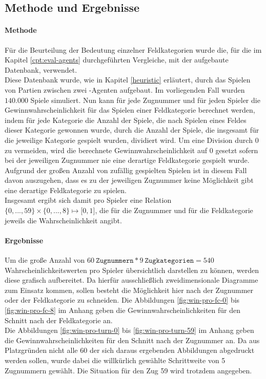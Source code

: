 \subsection{Methode und Ergebnisse}
\paragraph{Methode}
Für die Beurteilung der Bedeutung einzelner Feldkategorien wurde die, für die im Kapitel \ref{cpt:eval-agents} durchgeführten Vergleiche, mit der  aufgebaute Datenbank, verwendet.
\\Diese Datenbank wurde, wie in Kapitel \ref{heuristic} erläutert, durch das Spielen von Partien zwischen zwei -Agenten aufgebaut. Im vorliegenden Fall wurden $140.000$ Spiele simuliert. Nun kann für jede Zugnummer und für jeden Spieler die Gewinnwahrscheinlichkeit für das Spielen einer Feldkategorie berechnet werden, indem für jede Kategorie die Anzahl der Spiele, die nach Spielen eines Feldes dieser Kategorie gewonnen wurde, durch die Anzahl der Spiele, die insgesamt für die jeweilige Kategorie gespielt wurden, dividiert wird. Um eine Division durch $0$ zu vermeiden, wird die berechnete Gewinnwahrscheinlichkeit auf $0$ gesetzt sofern bei der jeweiligen Zugnummer nie eine derartige Feldkategorie gespielt wurde. Aufgrund der großen Anzahl von zufällig gespielten Spielen ist in diesem Fall davon auszugehen, dass es zu der jeweiligen Zugnummer keine Möglichkeit gibt eine derartige Feldkategorie zu spielen. 
\\Insgesamt ergibt sich damit pro Spieler eine Relation $\lbrace0, ..., 59\rbrace\times\lbrace0, ..., 8\rbrace\mapsto\lbrack0,1\rbrack$, die für die Zugnummer und für die Feldkategorie jeweils die Wahrscheinlichkeit angibt.
  
\paragraph{Ergebnisse}
Um die große Anzahl von $60\ \mathtt{Zugnummern} * 9\ \mathtt{Zugkategorien} = 540$ Wahrscheinlichkeitswerten pro Spieler übersichtlich darstellen zu können, werden diese grafisch aufbereitet. Da hierfür ausschließlich zweidimensionale Diagramme zum Einsatz kommen, sollen besteht die Möglichkeit hier nach der Zugnummer oder der Feldkategorie zu schneiden. Die Abbildungen \ref{fig:win-pro-fc-0} bis \ref{fig:win-pro-fc-8} im Anhang geben die Gewinnwahrscheinlichkeiten für den Schnitt nach der Feldkategorie an.
\\Die Abbildungen \ref{fig:win-pro-turn-0} bis \ref{fig:win-pro-turn-59} im Anhang geben die Gewinnwahrscheinlichkeiten für den Schnitt nach der Zugnummer an. Da aus Platzgründen nicht alle 60 der sich daraus ergebenden Abbildungen abgedruckt werden sollen, wurde dabei die willkürlich gewählte Schrittweite von 5 Zugnummern gewählt. Die Situation für den Zug 59 wird trotzdem angegeben.

